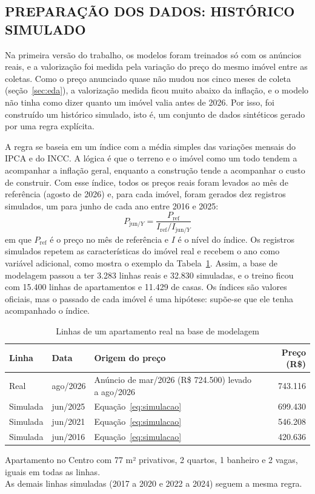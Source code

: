 \documentclass[
  article,
  a4paper,
  12pt,
  fleqn,
  oneside,
  chapter = TITLE,
  section = TITLE,
]{abntex2}
\begin{document}
\subsection{PREPARAÇÃO DOS DADOS: HISTÓRICO SIMULADO}\label{sec:historico}

Na primeira versão do trabalho, os modelos foram treinados só com os anúncios reais, e a valorização foi medida pela variação do preço do mesmo imóvel entre as coletas. Como o preço anunciado quase não mudou nos cinco meses de coleta (seção~\ref{sec:eda}), a valorização medida ficou muito abaixo da inflação, e o modelo não tinha como dizer quanto um imóvel valia antes de 2026. Por isso, foi construído um histórico simulado, isto é, um conjunto de dados sintéticos gerado por uma regra explícita.

A regra se baseia em um índice com a média simples das variações mensais do IPCA e do INCC. A lógica é que o terreno e o imóvel como um todo tendem a acompanhar a inflação geral, enquanto a construção tende a acompanhar o custo de construir. Com esse índice, todos os preços reais foram levados ao mês de referência (agosto de 2026) e, para cada imóvel, foram gerados dez registros simulados, um para junho de cada ano entre 2016 e 2025:
\begin{equation}
P_{\text{jun}/Y} = \frac{P_{\text{ref}}}{I_{\text{ref}} / I_{\text{jun}/Y}}
\label{eq:simulacao}
\end{equation}
em que $P_{\text{ref}}$ é o preço no mês de referência e $I$ é o nível do índice. Os registros simulados repetem as características do imóvel real e recebem o ano como variável adicional, como mostra o exemplo da Tabela~\ref{tab:exemplo}. Assim, a base de modelagem passou a ter 3.283 linhas reais e 32.830 simuladas, e o treino ficou com 15.400 linhas de apartamentos e 11.429 de casas. Os índices são valores oficiais, mas o passado de cada imóvel é uma hipótese: supõe-se que ele tenha acompanhado o índice.

\begin{table}[!htb]
  \caption{Linhas de um apartamento real na base de modelagem}
  \label{tab:exemplo}
  \centering
  \small
  \begin{tabular}{lllr}
    \hline
    \textbf{Linha} & \textbf{Data} & \textbf{Origem do preço} & \textbf{Preço (R\$)} \\
    \hline
    Real & ago/2026 & Anúncio de mar/2026 (R\$ 724.500) levado a ago/2026 & 743.116 \\
    Simulada & jun/2025 & Equação~\ref{eq:simulacao} & 699.430 \\
    Simulada & jun/2021 & Equação~\ref{eq:simulacao} & 546.208 \\
    Simulada & jun/2016 & Equação~\ref{eq:simulacao} & 420.636 \\
    \hline
  \end{tabular}

  \footnotesize{Apartamento no Centro com 77 m² privativos, 2 quartos, 1 banheiro e 2 vagas, iguais em todas as linhas.\\As demais linhas simuladas (2017 a 2020 e 2022 a 2024) seguem a mesma regra.}
\end{table}
\end{document}
